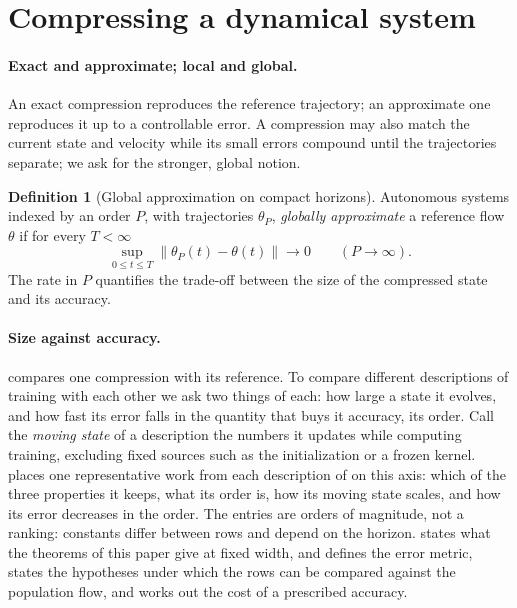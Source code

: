 \documentclass[11pt]{article}
\theoremstyle{definition}
\newtheorem{definition}[theorem]{Definition}
\theoremstyle{remark}
\newcommand{\norm}[1]{\left\lVert #1\right\rVert}
\begin{document}
\section{Compressing a dynamical system}
\label{sec:notions}

\paragraph{Exact and approximate; local and global.}
An exact compression reproduces the reference trajectory; an approximate one
reproduces it up to a controllable error.  A compression may also match the
current state and velocity while its small errors compound until the
trajectories separate; we ask for the stronger, global notion.

\begin{definition}[Global approximation on compact horizons]
\label{def:global}
Autonomous systems indexed by an order $P$, with trajectories $\theta_P$,
\emph{globally approximate} a reference flow $\theta$ if for every $T<\infty$
\[
  \sup_{0\le t\le T}\norm{\theta_P(t)-\theta(t)}\longrightarrow0
  \qquad(P\to\infty).
\]
The rate in $P$ quantifies the trade-off between the size of the compressed
state and its accuracy.
\end{definition}

\paragraph{Size against accuracy.}
 compares one compression with its reference.  To compare
different descriptions of training with each other we ask two things of each:
how large a state it evolves, and how fast its error falls in the quantity
that buys it accuracy, its order.  Call the \emph{moving state} of a
description the numbers it updates while computing training, excluding fixed
sources such as the initialization or a frozen kernel.   places
one representative work from each description of  on this
axis: which of the three properties it keeps, what its order is, how its
moving state scales, and how its error decreases in the order.  The entries
are orders of magnitude, not a ranking: constants differ between rows and
depend on the horizon.   states what the theorems of this paper
give at fixed width, and  defines the error metric, states the
hypotheses under which the rows can be compared against the population flow,
and works out the cost of a prescribed accuracy.
\end{document}

